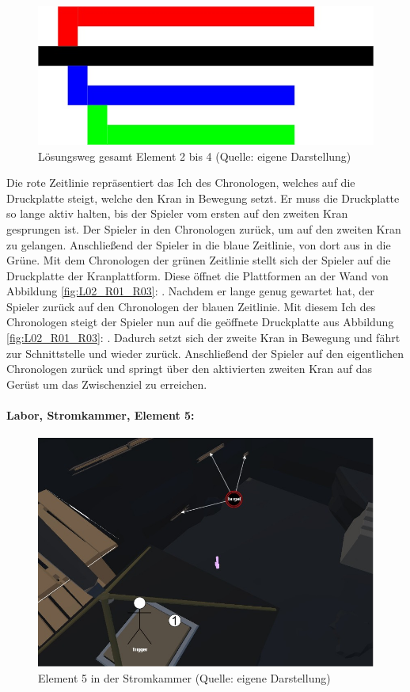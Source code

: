 \begin{figure}[ht]
\centering
\includegraphics[width=0.8\linewidth]{content/pictures/Raetsel-L02_E02_4_V01_Loesung}
\caption{Lösungsweg gesamt Element 2 bis 4 (Quelle: eigene Darstellung)}
\label{fig:L02_E02_04_L01}
\end{figure}

Die rote Zeitlinie repräsentiert das Ich des Chronologen, welches auf die Druckplatte steigt, welche den Kran in Bewegung setzt. Er muss die Druckplatte so lange aktiv halten, bis der Spieler vom ersten auf den zweiten Kran gesprungen ist. Der Spieler  in den Chronologen zurück, um auf den zweiten Kran zu gelangen. Anschließend  der Spieler in die blaue Zeitlinie, von dort aus in die Grüne. Mit dem Chronologen der grünen Zeitlinie stellt sich der Spieler auf die Druckplatte der Kranplattform. Diese öffnet die Plattformen an der Wand von Abbildung \ref{fig:L02_R01_R03}: . Nachdem er lange genug gewartet hat,  der Spieler zurück auf den Chronologen der blauen Zeitlinie. Mit diesem Ich des Chronologen steigt der Spieler nun auf die geöffnete Druckplatte aus Abbildung \ref{fig:L02_R01_R03}: . Dadurch setzt sich der zweite Kran in Bewegung und fährt zur Schnittstelle und wieder zurück. Anschließend  der Spieler auf den eigentlichen Chronologen zurück und springt über den aktivierten zweiten Kran auf das Gerüst um das Zwischenziel zu erreichen.

\paragraph{Labor, Stromkammer, Element 5:}\label{p:lse5}

\begin{figure}[ht]
\centering
\includegraphics[width=0.8\linewidth]{content/pictures/Raetsel-L02_R01_R05.jpg}
\caption{Element 5 in der Stromkammer (Quelle: eigene Darstellung)}
\label{fig:L02_R01_R05}
\end{figure}

